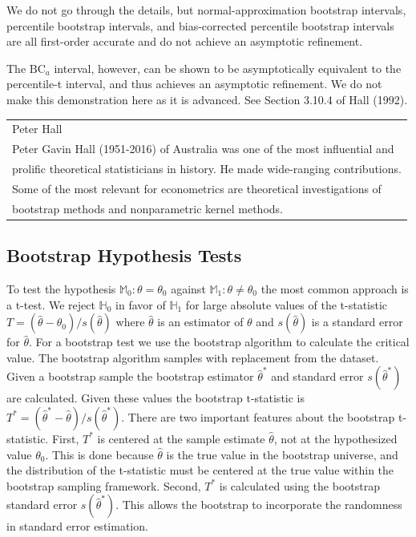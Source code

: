 \documentclass[10pt]{article}
\begin{document}
We do not go through the details, but normal-approximation bootstrap intervals, percentile bootstrap intervals, and bias-corrected percentile bootstrap intervals are all first-order accurate and do not achieve an asymptotic refinement.

The $\mathrm{BC}_{a}$ interval, however, can be shown to be asymptotically equivalent to the percentile-t interval, and thus achieves an asymptotic refinement. We do not make this demonstration here as it is advanced. See Section 3.10.4 of Hall (1992).

\begin{tabular}{|l|}
\hline
Peter Hall \\
Peter Gavin Hall (1951-2016) of Australia was one of the most influential and \\
prolific theoretical statisticians in history. He made wide-ranging contributions. \\
Some of the most relevant for econometrics are theoretical investigations of \\
bootstrap methods and nonparametric kernel methods. \\
\end{tabular}

\subsection{Bootstrap Hypothesis Tests}
To test the hypothesis $\mathbb{M}_{0}: \theta=\theta_{0}$ against $\mathbb{M}_{1}: \theta \neq \theta_{0}$ the most common approach is a t-test. We reject $\mathbb{H}_{0}$ in favor of $\mathbb{H}_{1}$ for large absolute values of the t-statistic $T=\left(\widehat{\theta}-\theta_{0}\right) / s(\hat{\theta})$ where $\widehat{\theta}$ is an estimator of $\theta$ and $s(\widehat{\theta})$ is a standard error for $\widehat{\theta}$. For a bootstrap test we use the bootstrap algorithm to calculate the critical value. The bootstrap algorithm samples with replacement from the dataset. Given a bootstrap sample the bootstrap estimator $\widehat{\theta}^{*}$ and standard error $s\left(\widehat{\theta}^{*}\right)$ are calculated. Given these values the bootstrap $\mathrm{t}$-statistic is $T^{*}=\left(\widehat{\theta}^{*}-\widehat{\theta}\right) / s\left(\widehat{\theta}^{*}\right)$. There are two important features about the bootstrap t-statistic. First, $T^{*}$ is centered at the sample estimate $\widehat{\theta}$, not at the hypothesized value $\theta_{0}$. This is done because $\widehat{\theta}$ is the true value in the bootstrap universe, and the distribution of the t-statistic must be centered at the true value within the bootstrap sampling framework. Second, $T^{*}$ is calculated using the bootstrap standard error $s\left(\widehat{\theta}^{*}\right)$. This allows the bootstrap to incorporate the randomness in standard error estimation.
\end{document}
